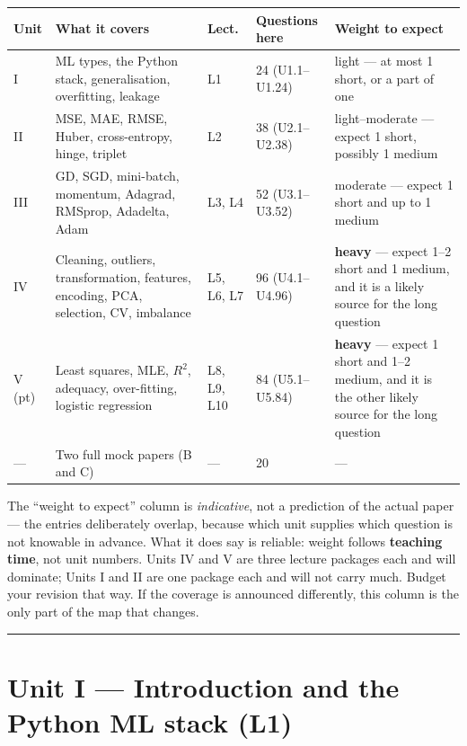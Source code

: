 \documentclass[11pt,a4paper]{article}
\begin{document}
\begin{center}\footnotesize\begin{tabular}{@{}p{0.9cm}p{5.4cm}p{1.0cm}p{2.4cm}p{3.0cm}@{}}\toprule
\textbf{Unit} & \textbf{What it covers} & \textbf{Lect.} & \textbf{Questions here} & \textbf{Weight to expect}\\
\midrule
I & ML types, the Python stack, generalisation, overfitting, leakage & L1 & 24 (U1.1--U1.24) & light --- at most 1 short, or a part of one\\
II & MSE, MAE, RMSE, Huber, cross-entropy, hinge, triplet & L2 & 38 (U2.1--U2.38) & light--moderate --- expect 1 short, possibly 1 medium\\
III & GD, SGD, mini-batch, momentum, Adagrad, RMSprop, Adadelta, Adam & L3, L4 & 52 (U3.1--U3.52) & moderate --- expect 1 short and up to 1 medium\\
IV & Cleaning, outliers, transformation, features, encoding, PCA, selection, CV, imbalance & L5, L6, L7 & 96 (U4.1--U4.96) & \textbf{heavy} --- expect 1--2 short and 1 medium, and it is a likely source for the long question\\
V\,(pt) & Least squares, MLE, $R^2$, adequacy, over-fitting, logistic regression & L8, L9, L10 & 84 (U5.1--U5.84) & \textbf{heavy} --- expect 1 short and 1--2 medium, and it is the other likely source for the long question\\
--- & Two full mock papers (B and C) & --- & 20 & ---\\
\bottomrule\end{tabular}\end{center}

\noindent\small The ``weight to expect'' column is \emph{indicative}, not a
prediction of the actual paper --- the entries deliberately overlap, because
which unit supplies which question is not knowable in advance. What it does say
is reliable: weight follows \textbf{teaching time}, not unit numbers. Units IV
and V are three lecture packages each and will dominate; Units I and II are one
package each and will not carry much. Budget your revision that way. If the
coverage is announced differently, this column is the only part of the map that
changes.\normalsize

\vspace{0.6em}\hrule

\section*{Unit I --- Introduction and the Python ML stack \quad (L1)}
\end{document}
